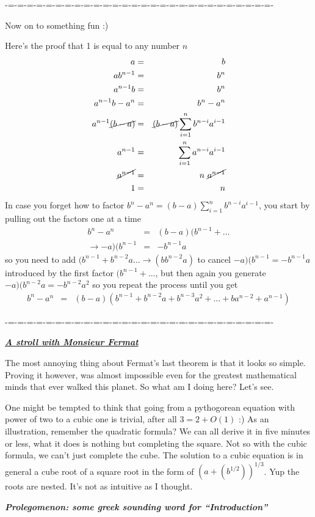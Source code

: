 \documentclass[aps,preprint,preprintnumbers,nofootinbib,showpacs,prd]{revtex4-1}
\newcommand{\nbea}{\begin{eqnarray*}}
\newcommand{\neea}{\end{eqnarray*}}
\begin{document}
-=-=-=-=-=-=-=-=-=-=-=-=-=-=-=-=-=-=-=-=-=-=-=-=-=-=-=-=-

Now on to something fun :)

Here's the proof that 1 is equal to any number $n$
%
\nbea
a & = & b \\
a b^{n-1} & = & b^{n}\\
a^{n-1} b & = & b^{n}\\
a^{n-1} b - a^{n} & = & b^{n} - a^{n}\\
a^{n-1} \cancel{(b - a)} & = & \cancel{(b - a)} \sum_{i=1}^{n} b^{n-i} a^{i-1} \\
a^{n-1} & = & \sum_{i=1}^{ n} a^{n-i} a^{i-1} \\
\cancel{a^{n-1}} & = &  n ~ \cancel{a^{n-1}} \\
1 & = & n
\neea
%
In case you forget how to factor $b^{n} - a^{n} = (b - a) \sum_{i=1}^{n} b^{n-i} a^{i-1}$, you start by pulling out the factors one at a time
%
\nbea
b^{n}  -  a^{n} & = & (b  -  a) (b^{n-1} + \dots \\
\rightarrow - a) (b^{n-1} & = & - b^{n-1} a
\neea
%
so you need to add $(b^{n-1} + b^{n-2} a \dots \rightarrow (b  b^{n-2} a)$ to cancel $-  a) (b^{n-1} = - b^{n-1} a$ introduced by the first factor $(b^{n-1} + \dots$, but then again you generate $- a) (b^{n-2} a = -b^{n-2} a^2$ so you repeat the process until you get
%
\nbea
b^{n}  -  a^{n} & = & (b  -  a) (b^{n-1} + b^{n-2} a + b^{n-3} a^2 + \dots + b a^{n-2} + a^{n-1})
\neea
%

-=-=-=-=-=-=-=-=-=-=-=-=-=-=-=-=-=-=-=-=-=-=-=-=-=-=-=-=-

\bigskip\underline{\textit{\textbf{A stroll with Monsieur Fermat}}}

The most annoying thing about Fermat's last theorem is that it looks so simple. Proving it however, was almost impossible even for the greatest mathematical minds that ever walked this planet. So what am I doing here? Let's see.

One might be tempted to think that going from a pythogorean equation with power of two to a cubic one is trivial, after all $3 = 2 + O(1)$ :) As an illustration, remember the quadratic formula? We can all derive it in five minutes or less, what it does is nothing but completing the square. Not so with the cubic formula, we can't just complete the cube. The solution to a cubic equation is in general a cube root of a square root in the form of $(a + (b^{1/2}))^{1/3}$. Yup the roots are nested. It's not as intuitive as I thought.

\bigskip\textbf{\textit{Prolegomenon: some greek sounding word for ``Introduction''}}
\end{document}
